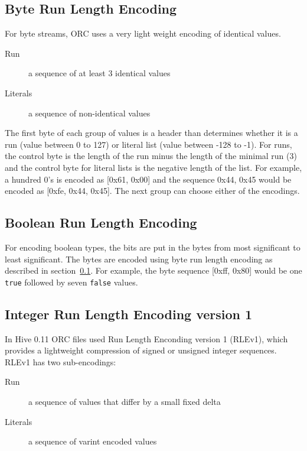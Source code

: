 \documentclass{article}
\begin{document}
\subsection{Byte Run Length Encoding}
\label{byte-rle}

For byte streams, ORC uses a very light weight encoding of identical
values.

\begin{description}
\item[Run] a sequence of at least 3 identical values
\item[Literals] a sequence of non-identical values
\end{description}

The first byte of each group of values is a header than determines
whether it is a run (value between 0 to 127) or literal list (value
between -128 to -1). For runs, the control byte is the length of the
run minus the length of the minimal run (3) and the control byte for
literal lists is the negative length of the list. For example, a
hundred 0's is encoded as [0x61, 0x00] and the sequence 0x44, 0x45
would be encoded as [0xfe, 0x44, 0x45]. The next group can choose
either of the encodings.

\subsection{Boolean Run Length Encoding}

For encoding boolean types, the bits are put in the bytes from most
significant to least significant. The bytes are encoded using byte run
length encoding as described in section~\ref{byte-rle}. For example,
the byte sequence [0xff, 0x80] would be one \verb+true+ followed by
seven \verb+false+ values.

\subsection{Integer Run Length Encoding version 1}

In Hive 0.11 ORC files used Run Length Enconding version 1 (RLEv1),
which provides a lightweight compression of signed or unsigned integer
sequences. RLEv1 has two sub-encodings:

\begin{description}
\item[Run] a sequence of values that differ by a small fixed delta
\item[Literals] a sequence of varint encoded values
\end{description}
\end{document}
